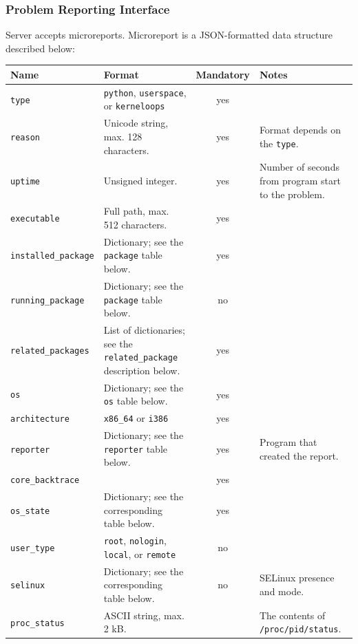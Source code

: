 \documentclass{article}
\begin{document}
\vfill
\subsubsection{Problem Reporting Interface}

Server accepts microreports.  Microreport is a JSON-formatted data
structure described below:

\begin{center}
\begin{tabular}{l|p{5cm}|c|p{5cm}}
\hline
Name & Format & Mandatory & Notes \\ \hline
\texttt{type} & \texttt{python}, \texttt{userspace}, or \texttt{kerneloops} & yes & \\
\texttt{reason} & Unicode string, max. 128 characters. & yes & Format depends on the \texttt{type}. \\
\texttt{uptime} & Unsigned integer. & yes & Number of seconds from program start to the problem. \\
\texttt{executable} & Full path, max. 512 characters. & yes & \\
\texttt{installed\_package} & Dictionary; see the \texttt{package} table below. & yes & \\
\texttt{running\_package} & Dictionary; see the \texttt{package} table below. & no & \\
\texttt{related\_packages} & List of dictionaries; see the \texttt{related\_package} description below. & yes & \\
\texttt{os} & Dictionary; see the \texttt{os} table below. & yes & \\
\texttt{architecture} & \texttt{x86\_64} or \texttt{i386} & yes & \\
\texttt{reporter} & Dictionary; see the \texttt{reporter} table below. & yes & Program that created the report. \\
\texttt{core\_backtrace} & & yes & \\
\texttt{os\_state} & Dictionary; see the corresponding table below. & yes & \\
\texttt{user\_type} & \texttt{root}, \texttt{nologin}, \texttt{local}, or \texttt{remote} & no & \\
\texttt{selinux} & Dictionary; see the corresponding table below. & no & SELinux presence and mode. \\
\texttt{proc\_status} & ASCII string, max. 2 kB. & & The contents of \texttt{/proc/pid/status}. \\
\hline
\end{tabular}
\end{center}
\end{document}
